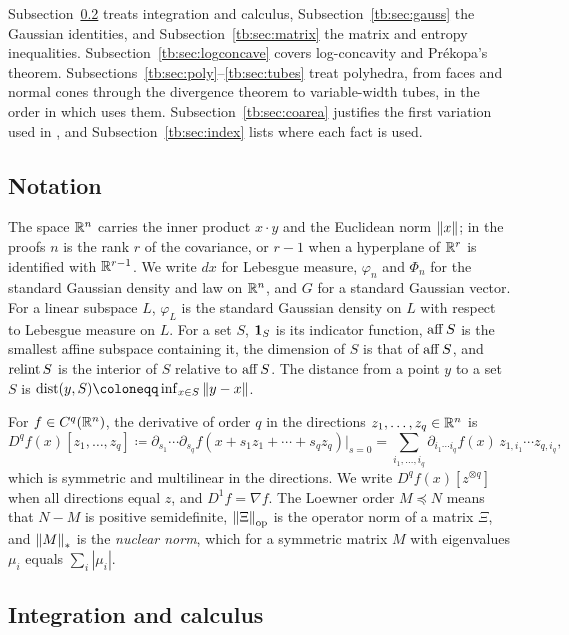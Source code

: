Subsection~\ref{tb:sec:calc} treats integration and calculus,
Subsection~\ref{tb:sec:gauss} the Gaussian identities, and
Subsection~\ref{tb:sec:matrix} the matrix and entropy inequalities.
Subsection~\ref{tb:sec:logconcave} covers log-concavity and
Pr\'ekopa's theorem. Subsections~\ref{tb:sec:poly}--\ref{tb:sec:tubes}
treat polyhedra, from faces and normal cones through the divergence
theorem to variable-width tubes, in the order in which
 uses them.
Subsection~\ref{tb:sec:coarea} justifies the first variation used
in , and
Subsection~\ref{tb:sec:index} lists where each fact is used.

\subsection{Notation}\label{tb:sec:notation}

The space \(\mathbb R^n\) carries the inner product \(x\cdot y\) and the Euclidean
norm \(\left\lVert x\right\rVert\); in the proofs \(n\) is the rank \(r\) of the covariance,
or \(r-1\) when a hyperplane of \(\mathbb R^r\) is identified with
\(\mathbb R^{r-1}\). We write \(dx\) for Lebesgue measure, \(\varphi_n\) and
\(\Phi_n\) for the standard Gaussian density and law on \(\mathbb R^n\), and \(G\)
for a standard Gaussian vector. For a linear subspace \(L\), \(\varphi_L\)
is the standard Gaussian density on \(L\) with respect to Lebesgue measure
on \(L\). For a set \(S\), \(\mathbf 1_S\) is its indicator function, \(\operatorname{aff} S\)
is the smallest affine subspace containing it, the dimension of \(S\) is
that of \(\operatorname{aff} S\), and \(\operatorname{relint} S\) is the interior of \(S\) relative to
\(\operatorname{aff} S\). The distance from a point \(y\) to a set \(S\) is
\(\dist(y,S)\coloneqq \inf_{x\in S}\norm{y-x}\).

For \(f\in C^q(\mathbb R^n)\), the derivative of order \(q\) in the directions
\(z_1,\ldots,z_q\in\mathbb R^n\) is
\[
 D^qf(x)[z_1,\ldots,z_q]
 \coloneqq \partial_{s_1}\cdots\partial_{s_q}f(x+s_1z_1+\cdots+s_qz_q)\Big|_{s=0}
 =\sum_{i_1,\ldots,i_q}\partial_{i_1\cdots i_q}f(x)\,
   z_{1,i_1}\cdots z_{q,i_q},
\]
which is symmetric and multilinear in the directions. We write
\(D^qf(x)[z^{\otimes q}]\) when all directions equal \(z\), and
\(D^1f=\nabla f\). The Loewner order \(M\preceq N\) means that
\(N-M\) is positive semidefinite, \(\left\lVert\Xi\right\rVert_{\mathrm{op}}\) is the operator norm
of a matrix \(\Xi\), and \(\left\lVert M\right\rVert_*\) is the \emph{nuclear norm}, which for
a symmetric matrix \(M\) with eigenvalues \(\mu_i\) equals \(\sum_i|\mu_i|\).

\subsection{Integration and calculus}\label{tb:sec:calc}

